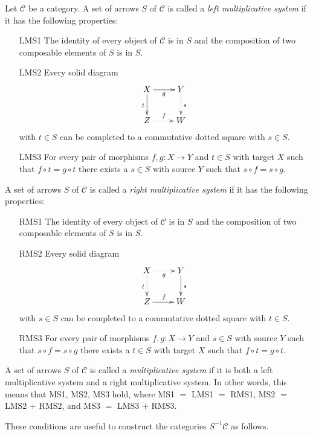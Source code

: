 \begin{definition}
\label{definition-multiplicative-system}
Let $\mathcal{C}$ be a category. A set of arrows $S$ of $\mathcal{C}$ is
called a {\it left multiplicative system} if it has the following properties:
\begin{enumerate}
\item[LMS1] The identity of every object of $\mathcal{C}$ is in $S$ and
the composition of two composable elements of $S$ is in $S$.
\item[LMS2] Every solid diagram
$$
\xymatrix{
X \ar[d]_t \ar[r]_g & Y \ar@{..>}[d]^s \\
Z \ar@{..>}[r]^f & W
}
$$
with $t \in S$ can be completed to a commutative dotted square with
$s \in S$.
\item[LMS3] For every pair of morphisms $f, g : X \to Y$ and
$t \in S$ with target $X$ such that $f \circ t = g \circ t$
there exists a $s \in S$ with source $Y$ such that
$s \circ f = s \circ g$.
\end{enumerate}
A set of arrows $S$ of $\mathcal{C}$ is
called a {\it right multiplicative system}
if it has the following properties:
\begin{enumerate}
\item[RMS1] The identity of every object of $\mathcal{C}$ is in $S$ and
the composition of two composable elements of $S$ is in $S$.
\item[RMS2] Every solid diagram
$$
\xymatrix{
X \ar@{..>}[d]_t \ar@{..>}[r]_g & Y \ar[d]^s \\
Z \ar[r]^f & W
}
$$
with $s \in S$ can be completed to a commutative dotted square with
$t \in S$.
\item[RMS3] For every pair of morphisms $f, g : X \to Y$ and
$s \in S$ with source $Y$ such that $s \circ f = s \circ g$
there exists a $t \in S$ with target $X$ such that
$f \circ t = g \circ t$.
\end{enumerate}
A set of arrows $S$ of $\mathcal{C}$ is called a {\it multiplicative system}
if it is both a left multiplicative system and a right multiplicative system.
In other words, this means that MS1, MS2, MS3 hold, where
MS1 $=$ LMS1 $=$ RMS1, MS2 $=$ LMS2 $+$ RMS2, and
MS3 $=$ LMS3 $+$ RMS3.
\end{definition}

\noindent
These conditions are useful to construct the categories $S^{-1}\mathcal{C}$
as follows.

